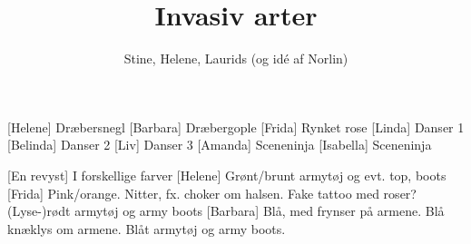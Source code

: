 \documentclass[a4paper,11pt]{article}
\title{Invasiv arter}
\author{Stine, Helene, Laurids (og idé af Norlin)}
\begin{document}
\maketitle

\begin{roles}
  [Helene] Dræbersnegl
  [Barbara] Dræbergople
  [Frida] Rynket rose
  [Linda] Danser 1
  [Belinda] Danser 2
  [Liv] Danser 3
  [Amanda] Sceneninja
  [Isabella] Sceneninja
\end{roles}

\begin{props}
    [En revyst] I forskellige farver
    [Helene] Grønt/brunt armytøj og evt. top, boots
    [Frida] Pink/orange. Nitter, fx. choker om halsen. Fake tattoo med roser? (Lyse-)rødt armytøj og army boots
    [Barbara] Blå, med frynser på armene. Blå knæklys om armene. Blåt armytøj og army boots.
\end{props}

\begin{center}
\end{center} 
\end{document}
